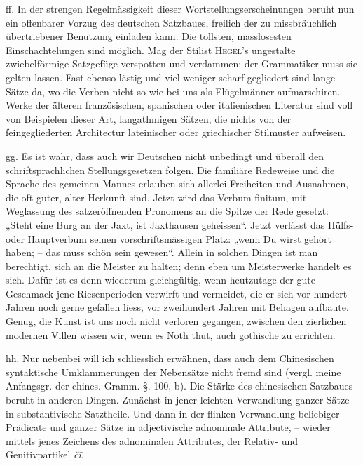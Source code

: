 ff. In der strengen Regelmässigkeit dieser Wortstellungserscheinungen beruht nun ein offenbarer Vorzug des deutschen Satzbaues, freilich  der zu missbräuchlich übertriebener Benutzung einladen kann. Die tollsten, masslosesten Einschachtelungen sind möglich. Mag der Stilist \textsc{Hegel}’s ungestalte zwiebelförmige Satzgefüge verspotten und verdammen: der Grammatiker muss sie gelten lassen. Fast ebenso lästig und viel weniger scharf gegliedert sind lange Sätze da, wo die Verben nicht so wie bei uns als Flügelmänner aufmarschiren. Werke der älteren französischen, spanischen oder italienischen Literatur sind voll von Beispielen dieser Art, langathmigen Sätzen, die nichts von der feingegliederten Architectur lateinischer oder griechischer Stilmuster aufweisen.

gg. Es ist wahr, dass  auch wir Deutschen nicht unbedingt und überall den schriftsprachlichen Stellungsgesetzen folgen. Die familiäre Redeweise und die Sprache des gemeinen Mannes erlauben sich allerlei Freiheiten und Ausnahmen, die oft guter, alter Herkunft sind. Jetzt wird das Verbum finitum, mit Weglassung des satzeröffnenden Pronomens an die Spitze der Rede gesetzt: „Steht eine Burg an der Jaxt, ist Jaxthausen geheissen“. Jetzt verlässt das Hülfs- oder Hauptverbum seinen vorschriftsmässigen Platz: „wenn Du wirst gehört haben; – das muss schön sein gewesen“. Allein in solchen Dingen ist man berechtigt, sich an die Meister zu halten; denn eben um Meisterwerke handelt es sich. Dafür ist es denn wiederum gleichgültig, wenn heutzutage der gute Geschmack jene Riesenperioden verwirft und vermeidet, die er sich vor hundert Jahren noch gerne gefallen liess, vor zweihundert Jahren mit Behagen aufbaute. Genug, die Kunst ist uns noch nicht verloren gegangen, zwischen den zierlichen modernen Villen wissen wir, wenn es Noth thut, auch gothische  zu errichten.

hh. Nur nebenbei will ich schliesslich erwähnen, dass auch dem Chinesischen syntaktische Umklammerungen der Nebensätze nicht fremd sind (vergl. meine Anfangsgr. der chines. Gramm. §. 100, b). Die Stärke des chinesischen Satzbaues beruht in anderen Dingen. Zunächst in jener \label{fp.451} leichten Verwandlung ganzer Sätze in substantivische Satztheile. Und dann in der  flinken Verwandlung beliebiger Prädicate und ganzer Sätze in adjectivische adnominale \label{sp.470} Attribute, – wieder mittels jenes Zeichens des adnominalen Attributes, der Relativ- und Genitivpartikel \textit{čī}.

